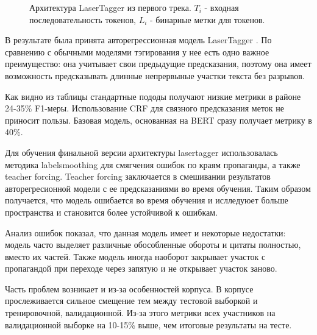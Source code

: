 \begin{figure}[H]
\setcounter{figure}{0}
 \caption{Архитектура LaserTagger из первого трека. $T_i$ - входная последовательность токенов, $L_i$ - бинарные метки для токенов.}
\end{figure}

В результате была принята авторегрессионная модель LaserTagger \cite{malmi2019encode}. По сравнению с обычными моделями тэгирования у нее есть одно важное преимущество: она учитывает свои предыдущие предсказания, поэтому она имеет возможность предсказывать длинные непрервыные участки текста без разрывов.

Как видно из таблицы стандартные пододы получают низкие метрики в районе 24-35\% F1-меры. Использование CRF для связного предсказания меток не приносит пользы. Базовая модель, основанная на BERT сразу получает метрику в 40\%.

Для обучения финальной версии архитектуры lasertagger использовалась методика labelsmoothing для смягчения ошибок по краям пропаганды, а также teacher forcing. Teacher forcing заключается в смешивании результатов авторегресионной модели с ее предсказаниями во время обучения. Таким образом получается, что модель ошибается во время обучения и ислледуюет больше пространства и становится более устойчивой к ошибкам.

Анализ ошибок показал, что данная модель имеет и некоторые недостатки: модель часто выделяет различные обособленные обороты и цитаты полностью, вместо их частей. Также модель иногда наоборот закрывает участок с пропагандой при переходе через запятую и не открывает участок заново.

Часть проблем возникает и из-за особенностей корпуса. В корпусе прослеживается сильное смещение тем между тестовой выборкой и тренировочной, валидационной. Из-за этого метрики всех участников на валидационной выборке на 10-15\% выше, чем итоговые результаты на тесте.
